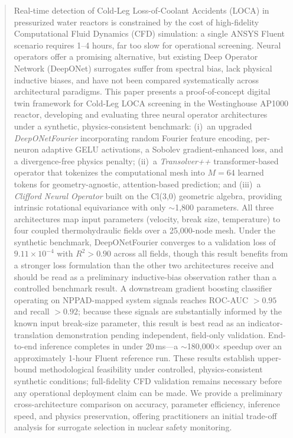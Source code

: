 \documentclass[journal]{IEEEtran}
\begin{document}
\begin{abstract}
Real-time detection of Cold-Leg Loss-of-Coolant Accidents (LOCA) in pressurized water reactors is constrained by the cost of high-fidelity Computational Fluid Dynamics (CFD) simulation: a single ANSYS Fluent scenario requires 1--4 hours, far too slow for operational screening. Neural operators offer a promising alternative, but existing Deep Operator Network (DeepONet) surrogates suffer from spectral bias, lack physical inductive biases, and have not been compared systematically across architectural paradigms. This paper presents a proof-of-concept digital twin framework for Cold-Leg LOCA screening in the Westinghouse AP1000 reactor, developing and evaluating three neural operator architectures under a synthetic, physics-consistent benchmark: (i)~an upgraded \emph{DeepONetFourier} incorporating random Fourier feature encoding, per-neuron adaptive GELU activations, a Sobolev gradient-enhanced loss, and a divergence-free physics penalty; (ii)~a \emph{Transolver++} transformer-based operator that tokenizes the computational mesh into $M=64$ learned tokens for geometry-agnostic, attention-based prediction; and (iii)~a \emph{Clifford Neural Operator} built on the Cl(3,0) geometric algebra, providing intrinsic rotational equivariance with only $\sim$1,800 parameters. All three architectures map input parameters (velocity, break size, temperature) to four coupled thermohydraulic fields over a 25,000-node mesh. Under the synthetic benchmark, DeepONetFourier converges to a validation loss of $9.11\times10^{-4}$ with $R^2 > 0.90$ across all fields, though this result benefits from a stronger loss formulation than the other two architectures receive and should be read as a preliminary inductive-bias observation rather than a controlled benchmark result. A downstream gradient boosting classifier operating on NPPAD-mapped system signals reaches ROC-AUC $> 0.95$ and recall $> 0.92$; because these signals are substantially informed by the known input break-size parameter, this result is best read as an indicator-translation demonstration pending independent, field-only validation. End-to-end inference completes in under 20\,ms---a $\sim$180,000$\times$ speedup over an approximately 1-hour Fluent reference run. These results establish upper-bound methodological feasibility under controlled, physics-consistent synthetic conditions; full-fidelity CFD validation remains necessary before any operational deployment claim can be made. We provide a preliminary cross-architecture comparison on accuracy, parameter efficiency, inference speed, and physics preservation, offering practitioners an initial trade-off analysis for surrogate selection in nuclear safety monitoring.
\end{abstract}
\end{document}
